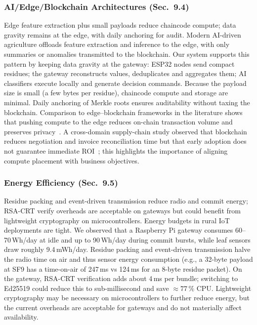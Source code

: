 \documentclass[12pt,onecolumn]{IEEEtran} %
\begin{document}
\subsubsection{AI/Edge/Blockchain Architectures (Sec.~9.4)}
Edge feature extraction plus small payloads reduce chaincode compute; data gravity remains at the edge, with daily anchoring for audit. Modern AI-driven agriculture offloads feature extraction and inference to the edge, with only summaries or anomalies transmitted to the blockchain. Our system supports this pattern by keeping data gravity at the gateway: ESP32 nodes send compact residues; the gateway reconstructs values, deduplicates and aggregates them; AI classifiers execute locally and generate decision commands. Because the payload size is small (a few bytes per residue), chaincode compute and storage are minimal. Daily anchoring of Merkle roots ensures auditability without taxing the blockchain. Comparison to edge–blockchain frameworks in the literature shows that pushing compute to the edge reduces on-chain transaction volume and preserves privacy~\cite{gsci_blockchain_supplychain_2022}. A cross-domain supply-chain study observed that blockchain reduces negotiation and invoice reconciliation time but that early adoption does not guarantee immediate ROI~\cite{gsci_blockchain_supplychain_2022}; this highlights the importance of aligning compute placement with business objectives.

\subsubsection{Energy Efficiency (Sec.~9.5)}
Residue packing and event-driven transmission reduce radio and commit energy; RSA-CRT verify overheads are acceptable on gateways but could benefit from lightweight cryptography on microcontrollers. Energy budgets in rural IoT deployments are tight. We observed that a Raspberry Pi gateway consumes 60–70\,Wh/day at idle and up to 90\,Wh/day during commit bursts, while leaf sensors draw roughly 9.4\,mWh/day. Residue packing and event-driven transmission halve the radio time on air and thus sensor energy consumption (e.g., a 32-byte payload at SF9 has a time-on-air of 247\,ms vs 124\,ms for an 8-byte residue packet). On the gateway, RSA-CRT verification adds about 4\,ms per bundle; switching to Ed25519 could reduce this to sub-millisecond and save $\approx77\,\%$ CPU. Lightweight cryptography may be necessary on microcontrollers to further reduce energy, but the current overheads are acceptable for gateways and do not materially affect availability.
\end{document}

